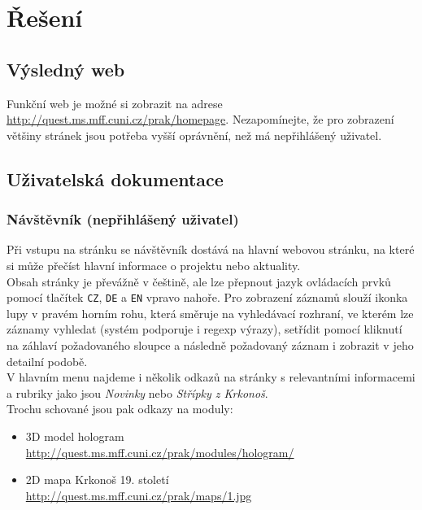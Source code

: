 \chapter{Řešení}


\section{Výsledný web}
Funkční web je možné si zobrazit na adrese \url{http://quest.ms.mff.cuni.cz/prak/homepage}.
Nezapomínejte, že pro zobrazení většiny stránek jsou potřeba vyšší oprávnění,
než má nepřihlášený uživatel.

\section{Uživatelská dokumentace}
\subsection{Návštěvník (nepřihlášený uživatel)}
Při vstupu na stránku se návštěvník dostává na hlavní webovou stránku,
na které si může přečíst hlavní informace o projektu nebo aktuality.\\
Obsah stránky je převážně v češtině, ale lze přepnout jazyk ovládacích prvků
pomocí tlačítek \texttt{CZ}, \texttt{DE} a \texttt{EN} vpravo nahoře.
Pro zobrazení záznamů slouží ikonka lupy v pravém horním rohu, která směruje na
vyhledávací rozhraní, ve kterém lze záznamy vyhledat (systém podporuje i regexp výrazy),
setřídit pomocí kliknutí na záhlaví požadovaného sloupce a následně požadovaný záznam i 
zobrazit v jeho detailní podobě.\\
V hlavním menu najdeme i několik odkazů na stránky s relevantními informacemi a
rubriky jako jsou \textit{Novinky} nebo \textit{Střípky z Krkonoš}.\\
Trochu schované jsou pak odkazy na moduly:
\begin{itemize}
	\item 3D model hologram \\
		\url{http://quest.ms.mff.cuni.cz/prak/modules/hologram/}
	\item 2D mapa Krkonoš 19. století \\
		\url{http://quest.ms.mff.cuni.cz/prak/maps/1.jpg}
\end{itemize}

